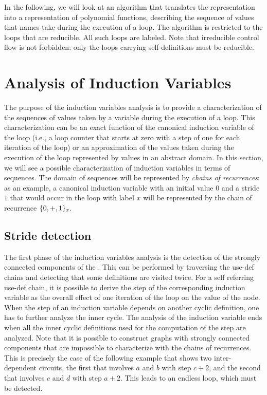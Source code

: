 {In the following, we will look at an algorithm that translates the
\SSA{} representation into a representation of polynomial functions,
describing the sequence of values that \SSA{} names take during the
execution of a loop. The algorithm is restricted to the loops that are
reducible. All such loops are labeled. Note that irreducible control flow is not forbidden: only the loops carrying self-definitions must
be reducible.

\section{Analysis of Induction Variables}

The purpose of the induction variables analysis is to provide a
characterization of the sequences of values taken by a variable during
the execution of a loop.  This characterization can be an exact
function of the canonical induction variable of the loop (i.e., a loop counter that starts at zero with a step of one for
each iteration of the loop) or an approximation of the values taken
during the execution of the loop represented by values in an abstract
domain.  In this section, we will see a possible characterization of
induction variables in terms of sequences.  The domain of sequences
will be represented by {\em chains of recurrences}: as an example, a
canonical induction variable with an initial value $0$ and a stride
$1$ that would occur in the loop with label $x$ will be represented by
the chain of recurrence $\{0, +, 1\}_x$.

\subsection{Stride detection}

The first phase of the induction variables analysis is the detection
of the strongly connected components of the \SSA{}.  This can be
performed by traversing the use-def \SSA{} chains and detecting that
some definitions are visited twice.  For a self referring use-def
chain, it is possible to derive the step of the corresponding
induction variable as the overall effect of one iteration of the loop
on the value of the \loopphi{} node.  When the step of an induction
variable depends on another cyclic definition, one has to further
analyze the inner cycle.  The analysis of the induction variable ends
when all the inner cyclic definitions used for the computation of the
step are analyzed. Note that it is possible to construct \SSA{} graphs
with strongly connected components that are impossible to characterize
with the chains of recurrences. This is precisely the case of the
following example that shows two inter-dependent circuits, the first
that involves $a$ and $b$ with step $c+2$, and the second that
involves $c$ and $d$ with step $a+2$. This leads to an endless loop,
which must be detected.

}

